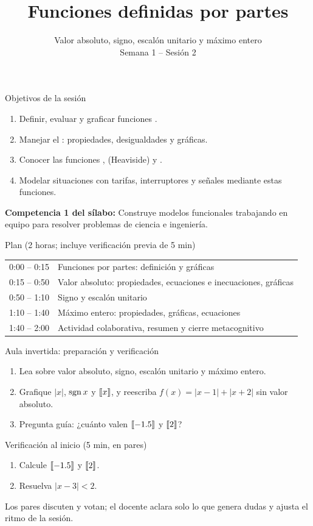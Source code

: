 \documentclass[10pt,aspectratio=169]{beamer}
\title[Funciones por partes]{Funciones definidas por partes}
\subtitle{Valor absoluto, signo, escalón unitario y máximo entero\\[2pt]\small Semana 1 -- Sesión 2}
\begin{document}
\begin{frame}
  \titlepage
\end{frame}

\begin{frame}{Objetivos de la sesión}
  \begin{enumerate}
    \item Definir, evaluar y graficar funciones .
    \item Manejar el : propiedades, desigualdades y gráficas.
    \item Conocer las funciones ,  (Heaviside) y .
    \item Modelar situaciones con tarifas, interruptores y señales mediante estas funciones.
  \end{enumerate}
  \vspace{1mm}
  {\small\textbf{Competencia 1 del sílabo:} Construye modelos funcionales trabajando en equipo para resolver problemas de ciencia e ingeniería.}
  \begin{block}{Plan (2 horas; incluye verificación previa de 5 min)}
    \begin{tabular}{ll}
      0:00 -- 0:15 & Funciones por partes: definición y gráficas\\
      0:15 -- 0:50 & Valor absoluto: propiedades, ecuaciones e inecuaciones, gráficas\\
      0:50 -- 1:10 & Signo y escalón unitario\\
      1:10 -- 1:40 & Máximo entero: propiedades, gráficas, ecuaciones\\
      1:40 -- 2:00 & Actividad colaborativa, resumen y cierre metacognitivo
    \end{tabular}
  \end{block}
\end{frame}

\begin{frame}{Aula invertida: preparación y verificación}
  \small
  \begin{previa}
    \begin{enumerate}
      \item Lea sobre valor absoluto, signo, escalón unitario y máximo entero.
      \item Grafique $|x|$, $\operatorname{sgn} x$ y $\left\llbracket x\right\rrbracket$, y reescriba $f(x)=|x-1|+|x+2|$ sin valor absoluto.
      \item Pregunta guía: ¿cuánto valen $\left\llbracket -1.5\right\rrbracket$ y $\left\llbracket 2\right\rrbracket$?
    \end{enumerate}
  \end{previa}
  \begin{block}{Verificación al inicio (5 min, en pares)}
    \begin{enumerate}
      \item Calcule $\left\llbracket -1.5\right\rrbracket$ y $\left\llbracket 2\right\rrbracket$.
      \item Resuelva $|x-3|<2$.
    \end{enumerate}
    Los pares discuten y votan; el docente aclara solo lo que genera dudas y ajusta el ritmo de la sesión.
  \end{block}
\end{frame}
\end{document}
